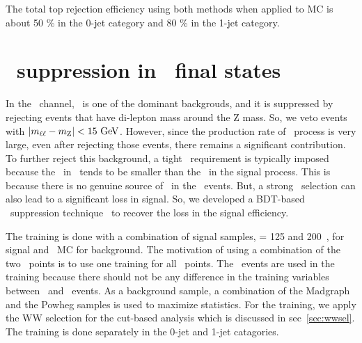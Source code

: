 The total top rejection efficiency using both methods when applied to \topbkg{} MC 
is about 50 \% in the 0-jet category and 80 \% in the 1-jet category. 


\section{\dyll\ suppression in \SF\ final states} 
\label{sec:dybkg}

In the \SF\ channel, \dyll\ is one of the dominant backgrouds, 
and it is suppressed by rejecting events that have 
di-lepton mass around the Z mass. So, we veto events with 
$\left|m_{\ell\ell} - m_{\mathrm{Z}} \right| < 15~\mathrm{Ge\kern -0.1em V}$. However, since the 
production rate of \dyll\ process is very large, even after
rejecting those events, there remains a significant contribution. 
To further reject this background, a tight \met\ requirement is typically imposed
because the \met\ in \dyll\ tends to be smaller than 
the \met\ in the signal process. 
This is because there is no genuine source of \met\ in the \dyll\ events. 
But, a strong \met\ selection can also lead to a significant loss in signal. 
So, we developed a BDT-based \dyll\ suppression technique~\cite{dymva} to recover the 
loss in the signal efficiency. 

The training is done with a combination of signal samples, \mHi = 125 and 200~\GeV, 
for signal and \dyll\ MC for background. The motivation of using a combination of the two 
\mHi\ points is to use one training for all \mHi\ points. The \DF\ events 
are used in the training because there should not be any difference in the training 
variables between \SF\ and \DF\ events. 
As a background sample, 
a combination of the Madgraph and the Powheg samples is used to maximize statistics. 
For the training, we apply the WW selection for the cut-based analysis
which is discussed in sec~\ref{sec:wwsel}.
The training is done separately in the 0-jet and 1-jet catagories. 

